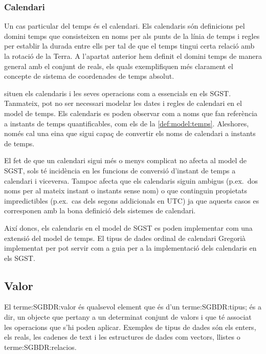 \subsubsection{Calendari}

Un cas particular del temps és el calendari. Els calendaris són
definicions pel domini temps que consisteixen en noms per als punts de
la línia de temps i regles per establir la durada entre ells per tal
de que el temps tingui certa relació amb la rotació de la Terra. A
l'apartat anterior hem definit el domini temps de manera general
amb el conjunt de reals, els quals exemplifiquen més clarament el
concepte de sistema de coordenades de temps absolut.

\textcite{dreyer94} situen els calendaris i les seves operacions com a
essencials en els SGST. Tanmateix, pot no ser necessari modelar les
dates i regles de calendari en el model de temps. Els calendaris es
poden observar com a noms que fan referència a instants de temps
quantificables, com els de la \autoref{def:model:temps}. Aleshores,
només cal una eina que sigui capaç de convertir els noms de calendari
a instants de temps.

El fet de que un calendari sigui més o menys complicat no afecta al
model de SGST, sols té incidència en les funcions de conversió
d'instant de temps a calendari i viceversa. Tampoc afecta que els
calendaris siguin ambigus (p.ex.\ dos noms per al mateix instant o
instants sense nom) o que continguin propietats impredictibles (p.ex.\
cas dels segons addicionals en UTC) ja que aquests casos es
corresponen amb la bona definició dels sistemes de calendari.

Així doncs, els calendaris en el model de SGST es poden implementar
com una extensió del model de temps. El tipus de dades ordinal de
calendari Gregorià implementat per
\textcite[cap.~16]{date02:_tempor_data_relat_model} pot servir com a
guia per a la implementació dels calendaris en els SGST.




\subsection{Valor}
\label{sec:sgst:valor}



El \gls{terme:SGBDR:valor} és qualsevol element que és d'un
\gls{terme:SGBDR:tipus}; és a dir, un objecte que
pertany a un determinat conjunt de valors i que té associat les
operacions que s'hi poden aplicar. Exemples de tipus de dades són els
enters, els reals, les cadenes de text i les estructures de dades com
vectors, llistes o \glspl{terme:SGBDR:relacio}.  

